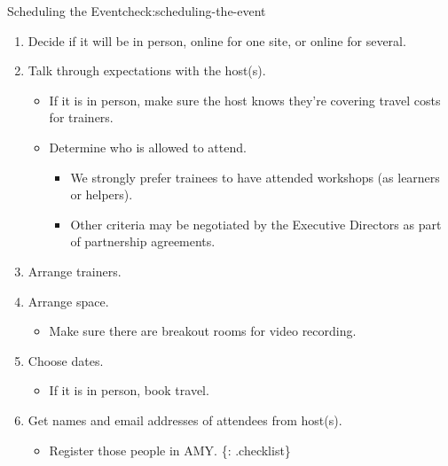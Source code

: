 \begin{checklist}{Scheduling the Event}{check:scheduling-the-event}

\begin{enumerate}
\item
  Decide if it will be in person, online for one site, or online for
  several.
\item
  Talk through expectations with the host(s).

  \begin{itemize}
    \item
    If it is in person, make sure the host knows they're covering travel
    costs for trainers.
  \item
    Determine who is allowed to attend.

    \begin{itemize}
        \item
      We strongly prefer trainees to have attended workshops (as
      learners or helpers).
    \item
      Other criteria may be negotiated by the Executive Directors as
      part of partnership agreements.
    \end{itemize}
  \end{itemize}

\item
  Arrange trainers.

\item
  Arrange space.

  \begin{itemize}
    \item
    Make sure there are breakout rooms for video recording.
  \end{itemize}

\item
  Choose dates.

  \begin{itemize}
    \item
    If it is in person, book travel.
  \end{itemize}

\item
  Get names and email addresses of attendees from host(s).

  \begin{itemize}
    \item
    Register those people in AMY. \{: .checklist\}
  \end{itemize}
\end{enumerate}
\end{checklist}

